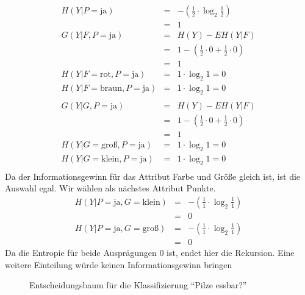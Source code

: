 \begin{eqnarray*}
	H(Y|P=\textrm{ja})			&=& -(\frac{1}{2} \cdot \log_2 \frac{1}{2})	\\
								&=& 1	\\
	G(Y|F,P=\textrm{ja})		&=& H(Y) - E H(Y|F)\\
								&=& 1 - (\frac{1}{2} \cdot 0 + \frac{1}{2} \cdot 0)	\\
								&=& 1\\
	H(Y|F=\textrm{rot}, P=\textrm{ja})		&=& 1 \cdot \log_2 1 = 0\\
	H(Y|F=\textrm{braun}, P=\textrm{ja})	&=& 1 \cdot \log_2 1 = 0\\
	\\
	G(Y|G,P=\textrm{ja})		&=& H(Y) - E H(Y|F)\\
								&=& 1 - (\frac{1}{2} \cdot 0 + \frac{1}{2} \cdot 0)	\\
								&=& 1\\
	H(Y|G=\textrm{groß}, P=\textrm{ja})		&=& 1 \cdot \log_2 1 = 0\\
	H(Y|G=\textrm{klein}, P=\textrm{ja})	&=& 1 \cdot \log_2 1 = 0\\
\end{eqnarray*}
Da der Informationsgewinn für das Attribut Farbe und Größe gleich ist, ist die Auswahl egal.
Wir wählen als nächstes Attribut Punkte.
\begin{eqnarray*}
	H(Y|P=\textrm{ja}, G=\textrm{klein})	&=& -(\frac{1}{1} \cdot \log_2 \frac{1}{1})	\\
								&=& 0	\\
	H(Y|P=\textrm{ja}, G=\textrm{groß})		&=& -(\frac{1}{1} \cdot \log_2 \frac{1}{1})	\\
								&=& 0
\end{eqnarray*}
Da die Entropie für beide Ausprägungen 0 ist, endet hier die Rekursion.
Eine weitere Einteilung würde keinen Informationsgewinn bringen
\begin{figure}[htbp]
	\centering
	\caption{Entscheidungsbaum für die Klassifizierung ``Pilze essbar?''}
\end{figure}